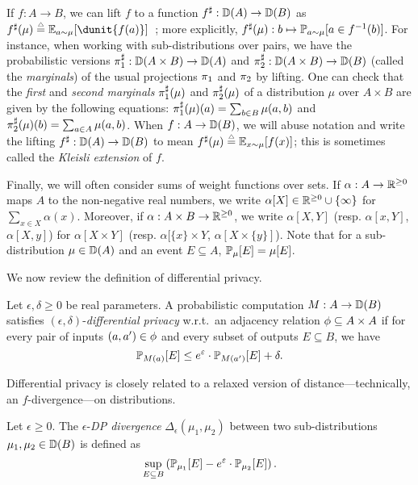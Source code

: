 \documentclass{lmcs}
\begin{document}
If $f : A \to B$, we can lift $f$ to a function $f^{\sharp} :{\mathbb{D}}(A) \to
{\mathbb{D}}(B)$ as
%
$\dlift{f}(\mu) \eqdef \dlet a \mu {\dunit{f(a)}}$~;
%
more explicitly,
%
$f^{\sharp}(\mu) : b \mapsto \mathbb{P}_{{a} \sim {\mu}} [{a \in f^{-1}(b)}]$.
%
For instance, when working with sub-distributions over pairs, we have the
probabilistic versions $\pi_{1}^{\sharp} : {\mathbb{D}}(A \times B) \to {\mathbb{D}}(A)$ and $\pi_{2}^{\sharp} :
{\mathbb{D}}(A \times B) \to {\mathbb{D}}(B)$ (called the \emph{marginals}) of the usual
projections $\pi_{1}$ and $\pi_{2}$ by lifting. One can check that the \emph{first}
and \emph{second marginals} $\pi_{1}^{\sharp}(\mu)$ and $\pi_{2}^{\sharp}(\mu)$ of a distribution
$\mu$ over $A \times B$ are given by the following equations:
$\pi_{1}^{\sharp} (\mu)(a)=\sum_{b\in B} \mu(a,b)$ and
$\pi_{2}^{\sharp} (\mu)(b)=\sum_{a\in A} \mu(a,b)$.
%
When $f : A \to {\mathbb{D}}(B)$, we will abuse notation and write the lifting $f^{\sharp} : {\mathbb{D}}(A) \to {\mathbb{D}}(B)$ to mean
%
$f^{\sharp}(\mu) \mathrel{\stackrel{\scriptscriptstyle \triangle}{=}} \mathbb{E}_{{x} \sim {\mu}} [{f(x)}]$;
%
this is sometimes called the \emph{Kleisli extension} of $f$.

Finally, we will often consider sums of weight functions over sets. If $\alpha :
A \to \mathbb{R}^{\geq 0}$ maps $A$ to the non-negative real numbers, we write $\alpha[X] \in
\mathbb{R}^{\geq 0} \cup \{ \infty \}$ for $\sum_{x \in X} \alpha(x)$. Moreover, if $\alpha :
A \times B \to \mathbb{R}^{\geq 0}$, we write $\alpha[X, Y]$ (resp. $\alpha[x, Y]$, $\alpha[X,
y]$) for $\alpha[X \times Y]$ (resp.  $\alpha[\{ x \} \times Y$, $\alpha[X
\times \{ y \}]$).  Note that for a sub-distribution $\mu \in {\mathbb{D}}(A)$ and an
event $E \subseteq A$, $\mathbb{P}_{\mu} [{E}] = \mu[E]$.

\medskip

We now review the definition of differential privacy.

\begin{defi} 
  Let $\epsilon, \delta \geq 0$ be real parameters. A probabilistic computation
  $M : A \to {\mathbb{D}}(B)$ satisfies $(\epsilon,\delta)$-\emph{differential privacy}
  w.r.t.\ an adjacency relation $\phi \subseteq A \times A$ if for every pair of
  inputs $(a, a') \in \phi$ and every subset of outputs $E \subseteq B$, we have
  \[
    \mathbb{P}_{M(a)} [{E}] \leq e^\varepsilon \cdot
      \mathbb{P}_{M(a')} [{E}] + \delta .
  \]
\end{defi}

Differential privacy is closely related to a relaxed version of
distance---technically, an $f$-divergence---on distributions.

\begin{defi}
  Let $\epsilon\geq 0$. The $\epsilon$-\emph{DP divergence}
  $\Delta_{\epsilon}(\mu_1,\mu_2)$ between two sub-distributions
  $\mu_1, \mu_2 \in {\mathbb{D}}(B)$ is defined as
  \[\sup_{E \subseteq B}
      \left(\mathbb{P}_{\mu_1} [{E}] - e^\varepsilon \cdot
              \mathbb{P}_{\mu_2} [{E}]\right) . \]
\end{defi}
\end{document}
